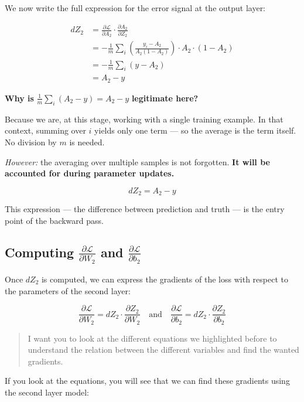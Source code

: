 \documentclass[11pt]{article}
\begin{document}
We now write the full expression for the error signal at the output layer:

\[
\begin{aligned}
dZ_2 
&= \frac{\partial \mathcal{L}}{\partial A_2} \cdot \frac{\partial A_2}{\partial Z_2} \\
&= -\frac{1}{m} \sum_i \left( \frac{y_i - A_2}{A_2(1 - A_2)} \right) \cdot A_2 \cdot (1 - A_2) \\
&= -\frac{1}{m} \sum_i (y - A_2) \\
&= A_2 - y
\end{aligned}
\]

\textbf{Why is} \( \frac{1}{m} \sum_i (A_2 - y) = A_2 - y \) \textbf{legitimate here?}

Because we are, at this stage, working with a single training example.  
In that context, summing over \( i \) yields only one term — so the average is the term itself.  
No division by \( m \) is needed.  

\textit{However:} the averaging over multiple samples is not forgotten.  
\textbf{It will be accounted for during parameter updates.}

\begin{resultbox}[title=Result --- Output Layer Error]
\[
dZ_2 = A_2 - y
\]

This expression — the difference between prediction and truth —  
is the entry point of the backward pass.
\end{resultbox}

\subsection{Computing $\frac{\partial \mathcal{L}}{\partial W_2}$ and $\frac{\partial \mathcal{L}}{\partial b_2}$}

Once \( dZ_2 \) is computed, we can express the gradients of the loss with respect to the parameters of the second layer:

\[
\boxed{
\frac{\partial \mathcal{L}}{\partial W_2} = dZ_2 \cdot \frac{\partial Z_2}{\partial W_2}
}
\quad \text{and} \quad
\boxed{
\frac{\partial \mathcal{L}}{\partial b_2} = dZ_2 \cdot \frac{\partial Z_2}{\partial b_2}
}
\]

\begin{quote}
I want you to look at the different equations we highlighted before to understand the relation between the different variables and find the wanted gradients.
\end{quote}

If you look at the equations, you will see that we can find these gradients using the second layer model:
\end{document}
